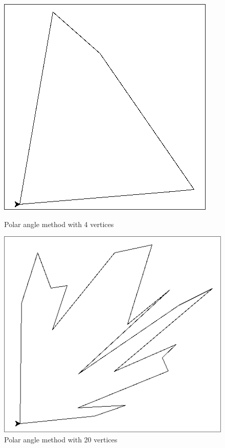 \documentclass[progress]{cmpreport}
\begin{document}
\begin{appendix}
	\label{Mapping}
	\begin{figure}[H]
		\centering
		\begin{minipage}[b]{0.45\textwidth}
			\centering
			\includegraphics[width=\textwidth]{images/FirstMappingSmall.jpg}
			\caption{Polar angle method with 4 vertices}
		\end{minipage}
		\hfill
		\begin{minipage}[b]{0.45\textwidth}
			\centering
			\includegraphics[width=\textwidth]{images/FirstMappingLarge.jpg}
			\caption{Polar angle method with 20 vertices}
		\end{minipage}
		\vspace{1em}


\end{figure}
\end{appendix}
\end{document}
